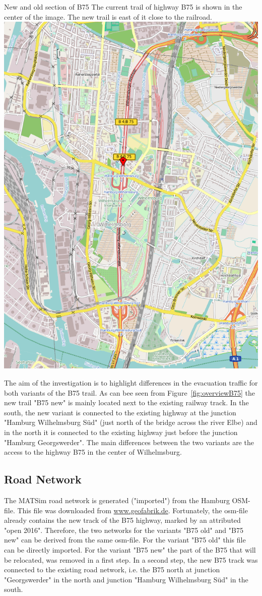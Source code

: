 \createfigure%
	{New and old section of B75}%
	{The current trail of highway B75 is shown in the center of the image. The new trail is east of it close to the railroad.}%
	{\label{fig:overviewB75}}%
	{\includegraphics[width=0.7\linewidth]{using/figures/B75overview}}%
{}

The aim of the investigation is to highlight differences in the evacuation traffic for both variants of the B75 trail. As can bee seen from Figure~\ref{fig:overviewB75} the new trail "B75 new" is mainly located next to the existing railway track.
In the south, the new variant is connected to the existing highway at the junction "Hamburg Wilhelmsburg Süd" (just north of the bridge across the river Elbe) and in the north it is connected to the existing highway just before the junction "Hamburg Georgswerder". 
The main differences between the two variants are the access to the highway B75 in the center of Wilhelmsburg.

\subsection{Road Network}
The MATSim road network is generated ("imported") from the Hamburg OSM-file. This file was downloaded from \url{www.geofabrik.de}. Fortunately, the osm-file already contains the new track of the B75 highway, marked by an attributed "open 2016". Therefore, the two networks for the variants "B75 old" and "B75 new" can be derived from the same osm-file. For the variant "B75 old" this file can be directly imported. For the variant "B75 new" the part of the B75 that will be relocated, was removed in a first step. In a second step, the new B75 track was connected to the existing road network, i.e. the B75 north at junction "Georgswerder" in the north and junction "Hamburg Wilhelmsburg Süd" in the south.

